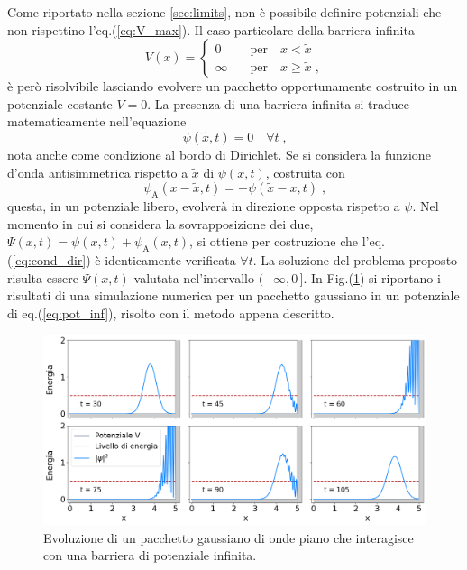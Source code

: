 \documentclass[12pt]{report}
\begin{document}
Come riportato nella sezione \ref{sec:limits}, non è possibile definire potenziali che non rispettino l'eq.(\ref{eq:V_max}). Il caso particolare della barriera infinita 
\begin{equation}
    V(x) = 
    \begin{cases}
        0 \quad &\text{per} \quad x < \tilde{x} \\
        \infty \quad &\text{per} \quad x \geq \tilde{x} \; \text{,}
    \end{cases}
    \label{eq:pot_inf}
\end{equation}
è però risolvibile lasciando evolvere un pacchetto opportunamente costruito in un potenziale costante $V = 0$. La presenza di una barriera infinita si traduce matematicamente nell'equazione
\begin{equation}
    \psi(\tilde{x}, t) = 0 \quad \forall t \; \text{,}
    \label{eq:cond_dir}
\end{equation}
nota anche come condizione al bordo di Dirichlet. 
Se si considera la funzione d'onda antisimmetrica rispetto a $\tilde{x}$ di $\psi(x,t)$, costruita con
\begin{equation}
    \psi_{\text{A}}(x -\tilde{x}, t) =  - \psi(\tilde{x} - x , t) \; \text{,} 
\end{equation}    
questa, in un potenziale libero, evolverà in direzione opposta rispetto a $\psi$. Nel momento in cui si considera la sovrapposizione dei due, $\Psi(x,t) = \psi(x, t) + \psi_{\text{A}}(x, t)$, si ottiene per costruzione che l'eq.(\ref{eq:cond_dir}) è identicamente verificata $\forall t$. 
La soluzione del problema proposto risulta essere $\Psi(x,t)$ valutata nel'intervallo $(-\infty, 0 \, ]$. In Fig.(\ref{fig:inf}) si riportano i risultati di una simulazione numerica per un pacchetto gaussiano in un potenziale di eq.(\ref{eq:pot_inf}), risolto con il metodo appena descritto.

\begin{figure}
    \centering
    \includegraphics[width = \textwidth]{immagini/inf.png}
    \caption{ \textcolor{dark-gray}{Evoluzione di un pacchetto gaussiano di onde piano che interagisce con una barriera di potenziale infinita. }}
    \label{fig:inf}
\end{figure}
\end{document}
